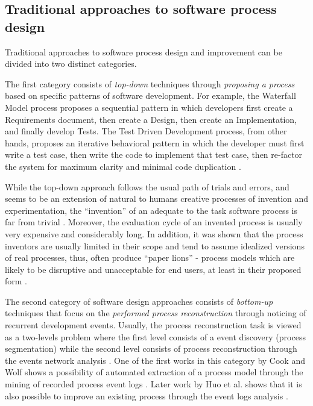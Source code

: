 \subsection{Traditional approaches to software process design}\label{sec_traditional_software_processes}
Traditional approaches to software process design and improvement can be divided into two 
distinct categories. 

The first category consists of \textit{top-down} techniques through \textit{proposing a process} based 
on specific patterns of software development. 
For example, the Waterfall Model process proposes a sequential pattern in which developers first create a 
Requirements document, then create a Design, then create an Implementation, and finally develop Tests. 
The Test Driven Development process, from other hands, proposes an iterative behavioral pattern in which
the developer must first write a test case, then write the code to implement that test case, then re-factor the 
system for maximum clarity and minimal code duplication \cite{citeulike:6086365}. 

While the top-down approach follows the usual path of trials and errors, and seems to be an 
extension of natural to humans creative processes of invention and experimentation, 
the ``invention'' of an adequate to the task software process is far from trivial 
\cite{citeulike:5043104} \cite{citeulike:1986013}. 
Moreover, the evaluation cycle of an invented process is usually very expensive and considerably long.
In addition, it was shown that the process inventors are usually limited in their scope and tend to 
assume idealized versions of real processes, thus, often produce ``paper lions'' - process models which are 
likely to be disruptive and unacceptable for end users, at least in their proposed form \cite{citeulike:9758924}.

The second category of software design approaches consists of \textit{bottom-up} techniques that focus 
on the \textit{performed process reconstruction} through noticing of recurrent development events. 
Usually, the process reconstruction task is viewed as a two-levels problem where the first level 
consists of a event discovery (process segmentation) while the second level consists of process 
reconstruction through the events network analysis \cite{citeulike:2703162}.
One of the first works in this category by Cook and Wolf shows a possibility of automated extraction 
of a process model through the mining of recorded process event logs 
\cite{citeulike:328044} \cite{citeulike:5120757} \cite{citeulike:5128143}. 
Later work by Huo et al. shows that it is also possible to improve an existing process
through the event logs analysis \cite{citeulike:7691059} \cite{citeulike:7690766}. 

